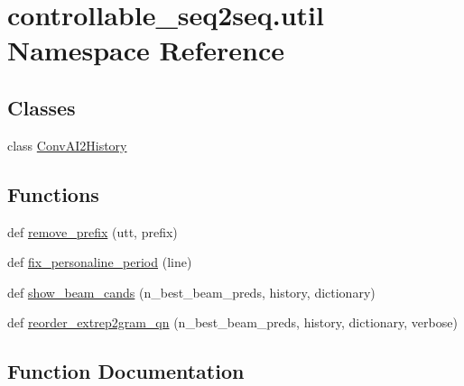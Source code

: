 \hypertarget{namespacecontrollable__seq2seq_1_1util}{}\section{controllable\+\_\+seq2seq.\+util Namespace Reference}
\label{namespacecontrollable__seq2seq_1_1util}
\subsection*{Classes}
\begin{DoxyCompactItemize}
\item 
class \hyperlink{classcontrollable__seq2seq_1_1util_1_1ConvAI2History}{Conv\+A\+I2\+History}
\end{DoxyCompactItemize}
\subsection*{Functions}
\begin{DoxyCompactItemize}
\item 
def \hyperlink{namespacecontrollable__seq2seq_1_1util_a6667311d5a790733c7e4bee96705e5fe}{remove\+\_\+prefix} (utt, prefix)
\item 
def \hyperlink{namespacecontrollable__seq2seq_1_1util_ac43b54c05e08b32a3732af240d957cec}{fix\+\_\+personaline\+\_\+period} (line)
\item 
def \hyperlink{namespacecontrollable__seq2seq_1_1util_a616447119991c41cded3c7a8c3e01acc}{show\+\_\+beam\+\_\+cands} (n\+\_\+best\+\_\+beam\+\_\+preds, history, dictionary)
\item 
def \hyperlink{namespacecontrollable__seq2seq_1_1util_ab2f0e2b4043e6e1fbd59ca27b9383dc0}{reorder\+\_\+extrep2gram\+\_\+qn} (n\+\_\+best\+\_\+beam\+\_\+preds, history, dictionary, verbose)
\end{DoxyCompactItemize}


\subsection{Function Documentation}
\mbox{\label{namespacecontrollable__seq2seq_1_1util_ac43b54c05e08b32a3732af240d957cec}} 
